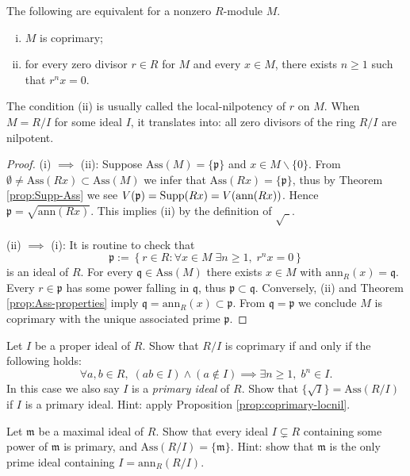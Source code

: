 \begin{proposition}\label{prop:coprimary-locnil}
	The following are equivalent for a nonzero $R$-module $M$.
	\begin{enumerate}[(i)]
		\item $M$ is coprimary;
		\item for every zero divisor $r \in R$ for $M$ and every $x \in M$, there exists $n \geq 1$ such that $r^n x = 0$.
	\end{enumerate}
\end{proposition}
The condition (ii) is usually called the local-nilpotency of $r$ on $M$. When $M = R/I$ for some ideal $I$, it translates into: all zero divisors of the ring $R/I$ are nilpotent.
\begin{proof}
	(i) $\implies$ (ii): Suppose $\text{Ass}(M) = \{ \mathfrak{p}\}$ and $x \in M \smallsetminus \{0\}$. From $\emptyset \neq \text{Ass}(Rx) \subset \text{Ass}(M)$ we infer that $\text{Ass}(Rx) = \{\mathfrak{p}\}$, thus by Theorem \ref{prop:Supp-Ass} we see $V(\mathfrak{p}) = \operatorname{Supp}(Rx) = V(\text{ann}(Rx))$. Hence $\mathfrak{p} = \sqrt{\text{ann}(Rx)}$. This implies (ii) by the definition of $\sqrt{\hspace{5pt}}$.
	
	(ii) $\implies$ (i): It is routine to check that
	\[ \mathfrak{p} := \left\{ r \in R: \forall x \in M \; \exists n \geq 1, \; r^n x = 0 \right\} \]
	is an ideal of $R$. For every $\mathfrak{q} \in \text{Ass}(M)$ there exists $x \in M$ with $\text{ann}_R(x) = \mathfrak{q}$. Every $r \in \mathfrak{p}$ has some power falling in $\mathfrak{q}$, thus $\mathfrak{p} \subset \mathfrak{q}$. Conversely, (ii) and Theorem \ref{prop:Ass-properties} imply $\mathfrak{q} = \text{ann}_R(x) \subset \mathfrak{p}$. From $\mathfrak{q}=\mathfrak{p}$ we conclude $M$ is coprimary with the unique associated prime $\mathfrak{p}$.
\end{proof}

\begin{exercise}\label{ex:primary-ideal}
	Let $I$ be a proper ideal of $R$. Show that $R/I$ is coprimary if and only if the following holds:
	\[ \forall a,b \in R, \; (ab \in I) \wedge (a \notin I) \implies \exists n \geq 1, \; b^n \in I. \]
	In this case we also say $I$ is a \emph{primary ideal} of $R$. Show that $\{\sqrt{I}\} = \text{Ass}(R/I)$ if $I$ is a primary ideal. Hint: apply Proposition \ref{prop:coprimary-locnil}.
\end{exercise}

\begin{exercise}\label{ex:maximal-primary}
	Let $\mathfrak{m}$ be a maximal ideal of $R$. Show that every ideal $I \subsetneq R$ containing some power of $\mathfrak{m}$ is primary, and $\text{Ass}(R/I) = \{\mathfrak{m}\}$. Hint: show that $\mathfrak{m}$ is the only prime ideal containing $I = \text{ann}_R(R/I)$.
\end{exercise}

